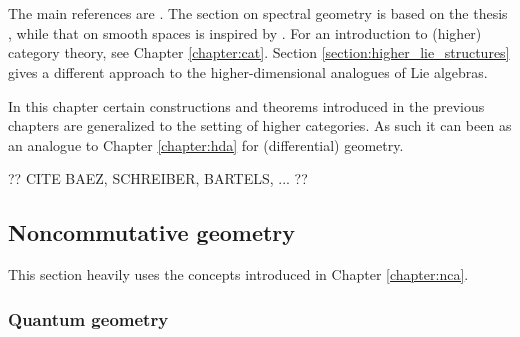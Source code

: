 \chapter{}\label{chapter:hdg}

    The main references are \cite{higher_gauge, phd_schreiber}. The section on spectral geometry is based on the thesis \cite{spectral_geometry}, while that on smooth spaces is inspired by \cite{baez_convenient}. For an introduction to (higher) category theory, see Chapter \ref{chapter:cat}. Section \ref{section:higher_lie_structures} gives a different approach to the higher-dimensional analogues of Lie algebras.

    In this chapter certain constructions and theorems introduced in the previous chapters are generalized to the setting of higher categories. As such it can been as an analogue to Chapter \ref{chapter:hda} for (differential) geometry.

    ?? CITE BAEZ, SCHREIBER, BARTELS, ... ??

\section{Noncommutative geometry}

    This section heavily uses the concepts introduced in Chapter \ref{chapter:nca}.

\subsection{Quantum geometry}



